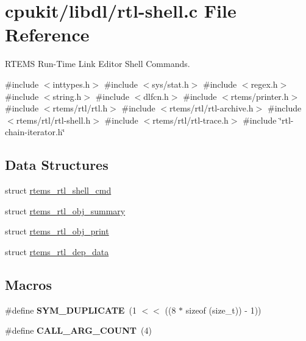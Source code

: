 \hypertarget{rtl-shell_8c}{}\section{cpukit/libdl/rtl-\/shell.c File Reference}
\label{rtl-shell_8c}


R\+T\+E\+MS Run-\/\+Time Link Editor Shell Commands.  


{\ttfamily \#include $<$inttypes.\+h$>$}\newline
{\ttfamily \#include $<$sys/stat.\+h$>$}\newline
{\ttfamily \#include $<$regex.\+h$>$}\newline
{\ttfamily \#include $<$string.\+h$>$}\newline
{\ttfamily \#include $<$dlfcn.\+h$>$}\newline
{\ttfamily \#include $<$rtems/printer.\+h$>$}\newline
{\ttfamily \#include $<$rtems/rtl/rtl.\+h$>$}\newline
{\ttfamily \#include $<$rtems/rtl/rtl-\/archive.\+h$>$}\newline
{\ttfamily \#include $<$rtems/rtl/rtl-\/shell.\+h$>$}\newline
{\ttfamily \#include $<$rtems/rtl/rtl-\/trace.\+h$>$}\newline
{\ttfamily \#include \char`\"{}rtl-\/chain-\/iterator.\+h\char`\"{}}\newline
\subsection*{Data Structures}
\begin{DoxyCompactItemize}
\item 
struct \mbox{\hyperlink{structrtems__rtl__shell__cmd}{rtems\+\_\+rtl\+\_\+shell\+\_\+cmd}}
\item 
struct \mbox{\hyperlink{structrtems__rtl__obj__summary}{rtems\+\_\+rtl\+\_\+obj\+\_\+summary}}
\item 
struct \mbox{\hyperlink{structrtems__rtl__obj__print}{rtems\+\_\+rtl\+\_\+obj\+\_\+print}}
\item 
struct \mbox{\hyperlink{structrtems__rtl__dep__data}{rtems\+\_\+rtl\+\_\+dep\+\_\+data}}
\end{DoxyCompactItemize}
\subsection*{Macros}
\begin{DoxyCompactItemize}
\item 
\mbox{\label{rtl-shell_8c_a3e1b05a78d09fb3550ca9da1cce25df1}} 
\#define {\bfseries S\+Y\+M\+\_\+\+D\+U\+P\+L\+I\+C\+A\+TE}~(1 $<$$<$ ((8 $\ast$ sizeof (size\+\_\+t)) -\/ 1))
\item 
\mbox{\label{rtl-shell_8c_a7ab06cdf6dd49a424299fcae011d5720}} 
\#define {\bfseries C\+A\+L\+L\+\_\+\+A\+R\+G\+\_\+\+C\+O\+U\+NT}~(4)
\end{DoxyCompactItemize}
